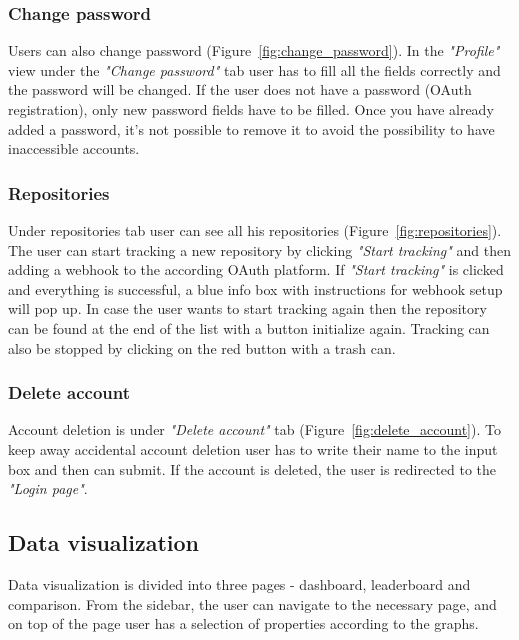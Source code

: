 \subsubsection{Change password}\label{subsubsec:change-password}
Users can also change password (Figure~\ref{fig:change_password}).
In the \textit{"Profile"} view under the \textit{"Change password"} tab user has to fill all the fields correctly and the password will be changed.
If the user does not have a password (OAuth registration), only new password fields have to be filled.
Once you have already added a password, it's not possible to remove it to avoid the possibility to have inaccessible accounts.

\subsubsection{Repositories}\label{subsubsec:repositories}
Under repositories tab user can see all his repositories (Figure~\ref{fig:repositories}).
The user can start tracking a new repository by clicking \textit{"Start tracking"} and then adding a webhook to the according OAuth platform.
If \textit{"Start tracking"} is clicked and everything is successful, a blue info box with instructions for webhook setup will pop up.
In case the user wants to start tracking again then the repository can be found at the end of the list with a button initialize again.
Tracking can also be stopped by clicking on the red button with a trash can.

\subsubsection{Delete account}\label{subsubsec:delete-account}
Account deletion is under \textit{"Delete account"} tab (Figure~\ref{fig:delete_account}).
To keep away accidental account deletion user has to write their name to the input box and then can submit.
If the account is deleted, the user is redirected to the \textit{"Login page"}.

\subsection{Data visualization}\label{subsec:data-visualization}
Data visualization is divided into three pages - dashboard, leaderboard and comparison.
From the sidebar, the user can navigate to the necessary page, and on top of the page user has a selection of properties according to the graphs.

